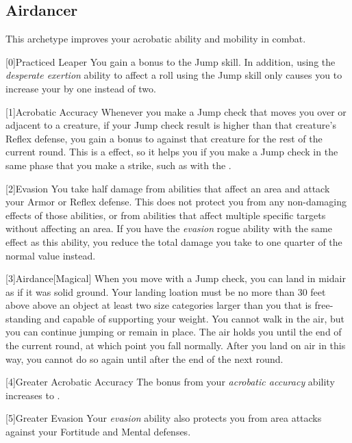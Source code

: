     \newpage
    \subsection{Airdancer}\label{Airdancer}
        This archetype improves your acrobatic ability and mobility in combat.

        [0]{Practiced Leaper} You gain a  bonus to the Jump skill.
        In addition, using the \textit{desperate exertion} ability to affect a roll using the Jump skill only causes you to increase your  by one instead of two.

        [1]{Acrobatic Accuracy} Whenever you make a Jump check that moves you over or adjacent to a creature, if your Jump check result is higher than that creature's Reflex defense, you gain a  bonus to  against that creature for the rest of the current round.
        This is a  effect, so it helps you if you make a Jump check in the same phase that you make a strike, such as with the  .

        [2]{Evasion} You take half damage from abilities that affect an area and attack your Armor or Reflex defense.
        This does not protect you from any non-damaging effects of those abilities, or from abilities that affect multiple specific targets without affecting an area.
        If you have the \textit{evasion} rogue ability with the same effect as this ability, you reduce the total damage you take to one quarter of the normal value instead.

        [3]{Airdance}[Magical] When you move with a Jump check, you can land in midair as if it was solid ground.
        Your landing loation must be no more than 30 feet above above an object at least two size categories larger than you that is free-standing and capable of supporting your weight.
        You cannot walk in the air, but you can continue jumping or remain in place.
        The air holds you until the end of the current round, at which point you fall normally.
        After you land on air in this way, you cannot do so again until after the end of the next round.

        [4]{Greater Acrobatic Accuracy} The bonus from your \textit{acrobatic accuracy} ability increases to .

        [5]{Greater Evasion} Your \textit{evasion} ability also protects you from area attacks against your Fortitude and Mental defenses.

